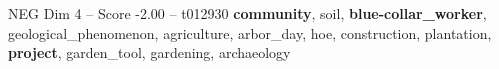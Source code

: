 \begin{textsample}{NEG Dim 4 – Score -2.00 – t012930}  \label{ex:f4_neg_039}
\textbf{community}, soil, \textbf{blue-collar\_worker}, geological\_phenomenon, agriculture, arbor\_day, hoe, construction, plantation, \textbf{project}, garden\_tool, gardening, archaeology

\end{textsample}
